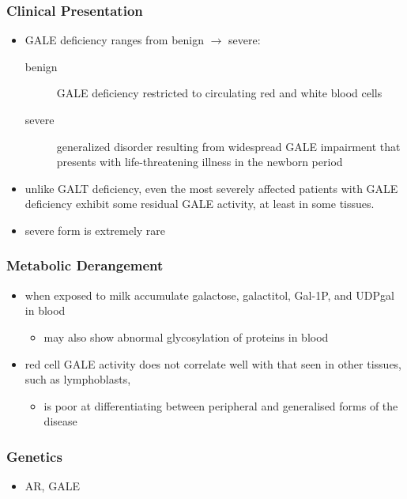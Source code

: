 \documentclass{scrartcl}
\begin{document}
\subsubsection{Clinical Presentation}
\label{sec:org7f0fd97}
\begin{itemize}
\item GALE deficiency ranges from benign \(\to\) severe:
\begin{description}
\item[{benign}] GALE deficiency restricted to circulating red and white blood cells
\item[{severe}] generalized disorder resulting from widespread GALE
impairment that presents with life-threatening illness
in the newborn period
\end{description}

\item unlike GALT deficiency, even the most severely affected patients
with GALE deficiency exhibit some residual GALE activity, at least
in some tissues.
\item severe form is extremely rare
\end{itemize}

\subsubsection{Metabolic Derangement}
\label{sec:orga600905}
\begin{itemize}
\item when exposed to milk accumulate galactose, galactitol, Gal-1P, and
UDPgal in blood
\begin{itemize}
\item may also show abnormal glycosylation of proteins in blood
\end{itemize}
\item red cell GALE activity does not correlate well with that seen in
other tissues, such as lymphoblasts,
\begin{itemize}
\item is poor at differentiating between peripheral and generalised forms of the disease
\end{itemize}
\end{itemize}

\subsubsection{Genetics}
\label{sec:orgee85c31}
\begin{itemize}
\item AR, GALE
\end{itemize}
\end{document}
